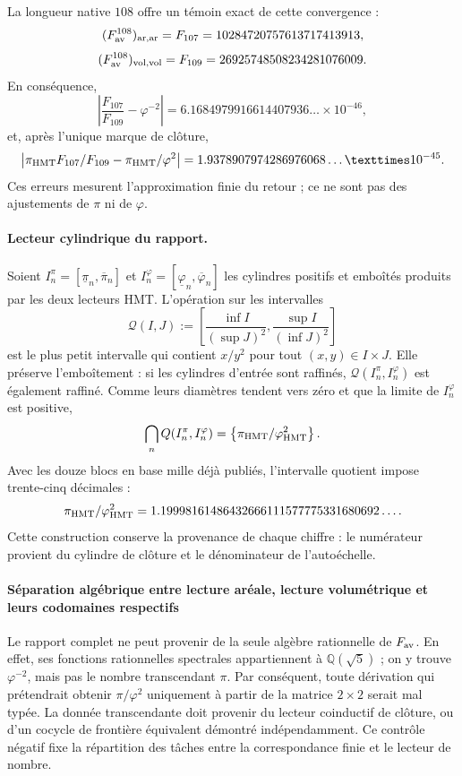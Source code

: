 La longueur native \(108\) offre un témoin exact de cette convergence :
\[
 (F_{\rm av}^{108})_{\rm ar,ar}
 =F_{107}=10284720757613717413913,
\]
\[
 (F_{\rm av}^{108})_{\rm vol,vol}
 =F_{109}=26925748508234281076009.
\]
En conséquence,
\[
 \left|
 \frac{F_{107}}{F_{109}}-\varphi^{-2}
 \right|
 =
 6.1684979916614407936\ldots\times10^{-46},
\]
et, après l'unique marque de clôture,
\[
 \left|
 \pi_{\rm HMT}\frac{F_{107}}{F_{109}}
 -\frac{\pi_{\rm HMT}}{\varphi^2}
 \right|
 =
 1.9378907974286976068\ldots\times10^{-45}.
\]
Ces erreurs mesurent l'approximation finie du retour ; ce ne sont pas des ajustements de
\(\pi\) ni de \(\varphi\).

\paragraph{Lecteur cylindrique du rapport.}
Soient \(I_n^\pi=[\underline\pi_n,\overline\pi_n]\) et
\(I_n^\varphi=[\underline\varphi_n,\overline\varphi_n]\) les cylindres
positifs et emboîtés produits par les deux lecteurs HMT\@. L'opération sur les
intervalles
\[
 \mathcal Q(I,J)
 :=
 \left[
 \frac{\inf I}{(\sup J)^2},
 \frac{\sup I}{(\inf J)^2}
 \right]
\]
est le plus petit intervalle qui contient \(x/y^2\) pour tout
\((x,y)\in I\times J\). Elle préserve l'emboîtement : si les cylindres d'entrée sont
raffinés, \(\mathcal Q(I_n^\pi,I_n^\varphi)\) est également raffiné. Comme leurs
diamètres tendent vers zéro et que la limite de \(I_n^\varphi\) est positive,
\[
 \bigcap_n\mathcal Q(I_n^\pi,I_n^\varphi)
 =
 \left\{\frac{\pi_{\rm HMT}}{\varphi_{\rm HMT}^2}\right\}.
\]
Avec les douze blocs en base mille déjà publiés, l'intervalle quotient impose
trente-cinq décimales :
\[
 \frac{\pi_{\rm HMT}}{\varphi_{\rm HMT}^2}
 =
 1.19998161486432666111577775331680692\ldots.
\]
Cette construction conserve la provenance de chaque chiffre : le numérateur
provient du cylindre de clôture et le dénominateur de l'autoéchelle.

\paragraph{Séparation algébrique entre lecture aréale, lecture volumétrique et leurs codomaines respectifs}
Le rapport complet ne peut provenir de la seule algèbre rationnelle de
\(F_{\rm av}\). En effet, ses fonctions rationnelles spectrales appartiennent à
\(\mathbb Q(\sqrt5)\) ; on y trouve \(\varphi^{-2}\), mais pas le nombre
transcendant \(\pi\). Par conséquent, toute dérivation qui prétendrait
obtenir \(\pi/\varphi^2\) uniquement à partir de la matrice \(2\times2\) serait
mal typée. La donnée transcendante doit provenir du lecteur coinductif de
clôture, ou d'un cocycle de frontière équivalent démontré
indépendamment. Ce contrôle négatif fixe la répartition des tâches entre
la correspondance finie et le lecteur de nombre.

